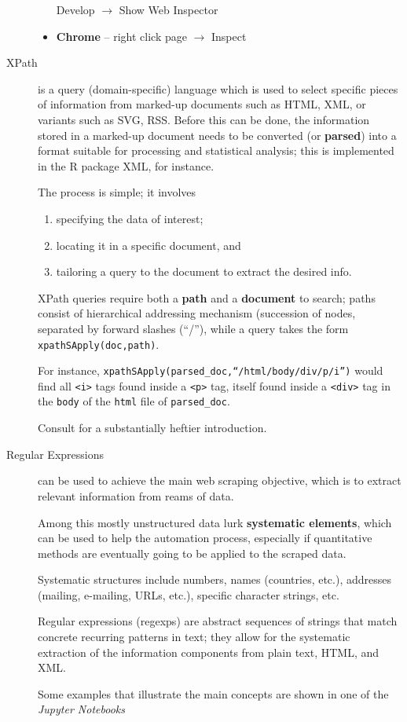 \begin{description}
\begin{itemize}[noitemsep]
Develop $\to$ Show Web Inspector
\item \textbf{Chrome} --  right click page $\to$ Inspect
\end{itemize}
\item[XPath] is a query (domain-specific) language which is 
used to select specific pieces of information from marked-up documents such as HTML, XML, or variants such as SVG, RSS. Before this can be done, the information stored in a marked-up document needs to be converted (or \textbf{parsed}) into a format suitable for processing and statistical analysis; this is implemented in the R package XML, for instance. \par The process is simple; it involves 
\begin{enumerate}[noitemsep]
\item specifying the data of interest;
\item locating it in a specific document, and
\item tailoring a query to the document to extract the desired info.
\end{enumerate}
XPath queries require both a \textbf{path} and a \textbf{document} to search; paths consist of hierarchical addressing mechanism (succession of nodes, separated by forward slashes (``/''), while a query takes the form \texttt{xpathSApply(doc,path)}. \par For instance, 
\texttt{xpathSApply(parsed\_doc,``/html/body/div/p/i'')} would find all \texttt{<i>} tags found inside a \texttt{<p>} tag, itself found inside a \texttt{<div>} tag in the \texttt{body} of the \texttt{html} file of \texttt{parsed\_doc}. \par Consult \cite{DC_MRMN} for a substantially heftier introduction. 
\item[Regular Expressions] can be used to achieve the main web scraping objective, which is to extract  relevant information from reams of data. \par Among this mostly unstructured data lurk \textbf{systematic elements}, which can be used to help the automation process, especially if quantitative methods are eventually going to be applied to the scraped data.
\par Systematic structures include numbers, names (countries, etc.), addresses (mailing, e-mailing, URLs, etc.), specific character strings, etc.
\par Regular expressions (regexps) are abstract sequences of strings that match concrete recurring patterns in text; they allow for the systematic extraction of the information components from plain text, HTML, and XML. \par Some examples that illustrate the main concepts are shown in one of the \textit{Jupyter Notebooks} %

\end{description}
